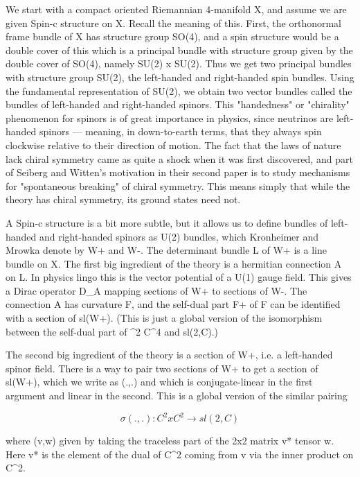 We start with a compact oriented Riemannian 4-manifold X, and assume we
are given Spin-c structure on X.  Recall the meaning of this.  First,
the orthonormal frame bundle of X has structure group SO(4), and a spin
structure would be a double cover of this which is a principal bundle
with structure group given by the double cover of SO(4), namely SU(2) x
SU(2).  Thus we get two principal bundles with structure group SU(2),
the left-handed and right-handed spin bundles.  Using the fundamental
representation of SU(2), we obtain two vector bundles called the bundles
of left-handed and right-handed spinors.  This "handedness" or
"chirality" phenomenon for spinors is of great importance in physics,
since neutrinos are left-handed spinors --- meaning, in down-to-earth
terms, that they always spin clockwise relative to their direction of
motion.  The fact that the laws of nature lack chiral symmetry came as
quite a shock when it was first discovered, and part of Seiberg and
Witten's motivation in their second paper is to study mechanisms for
"spontaneous breaking" of chiral symmetry.  This means simply that while
the theory has chiral symmetry, its ground states need not.

A Spin-c structure is a bit more subtle, but it allows us to define
bundles of left-handed and right-handed spinors as U(2) bundles,
which Kronheimer and Mrowka denote by W+ and W-.  The determinant
bundle L of W+ is a line bundle on X.  The first big ingredient of the
theory is a hermitian connection A on L.  In physics lingo this is the
vector potential of a U(1) gauge field.  This gives a Dirac operator D_A
mapping sections of W+ to sections of W-.  The connection A has
curvature F, and the self-dual part F+ of F can be identified with a
section of sl(W+).  (This is just a global version of the isomorphism
between the self-dual part of \Lambda ^2 C^4 and sl(2,C).)

The second big ingredient of the theory is a section \Psi  of W+, i.e. a 
left-handed spinor field.  There is a way to pair two sections of 
W+ to get a section of sl(W+), which we write as \sigma (.,.) and which is 
conjugate-linear in the first argument and linear in the second.
This is a global version of the similar pairing 

$$
                     \sigma (.,.): C^2 x C^2 \to  sl(2,C)
$$
    

where \sigma (v,w) given by taking the traceless part of the 2x2 matrix 
v* tensor w.  Here v* is the element of the dual of C^2 coming from 
v via the inner product on C^2.

